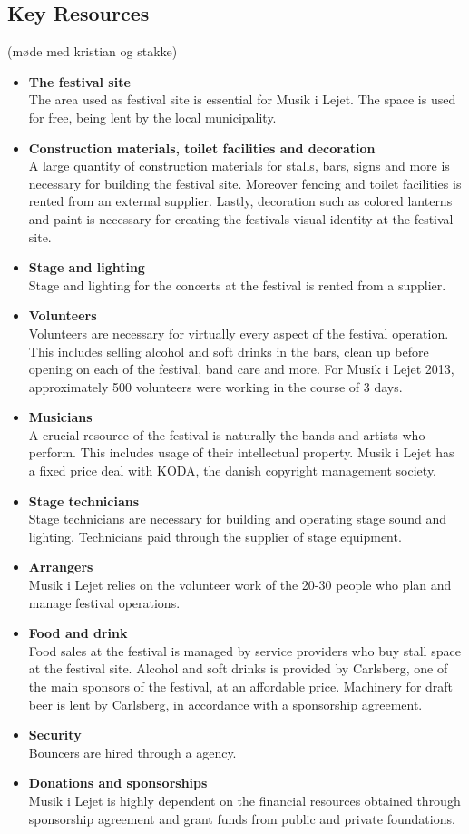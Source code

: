 \subsection{Key Resources} %
\label{sub:key_resources}
(møde med kristian og stakke)
\begin{itemize}
	\item \textbf{The festival site}\\
	The area used as festival site is essential for Musik i Lejet. The space is used for free, being lent by the local municipality.
	\item \textbf{Construction materials, toilet facilities and decoration}\\
	A large quantity of construction materials for stalls, bars, signs and more is necessary for building the festival site. Moreover fencing and toilet facilities is rented from an external supplier. Lastly, decoration such as colored lanterns and paint is necessary for creating the festivals visual identity at the festival site.
	\item \textbf{Stage and lighting}\\
	Stage and lighting for the concerts at the festival is rented from a supplier.
	\item \textbf{Volunteers}\\
	Volunteers are necessary for virtually every aspect of the festival operation. This includes selling alcohol and soft drinks in the bars, clean up before opening on each of the festival, band care and more. For Musik i Lejet 2013, approximately 500 volunteers were working in the course of 3 days.
	\item \textbf{Musicians}\\
	A crucial resource of the festival is naturally the bands and artists who perform. This includes usage of their intellectual property. Musik i Lejet has a fixed price deal with KODA, the danish copyright management society.
	\item \textbf{Stage technicians}\\
	Stage technicians are necessary for building and operating stage sound and lighting. Technicians paid through the supplier of stage equipment.
	\item \textbf{Arrangers}\\
	Musik i Lejet relies on the volunteer work of the 20-30 people who plan and manage festival operations.
	\item \textbf{Food and drink}\\
	Food sales at the festival is managed by service providers who buy stall space at the festival site. Alcohol and soft drinks is provided by Carlsberg, one of the main sponsors of the festival, at an affordable price. Machinery for draft beer is lent by Carlsberg, in accordance with a sponsorship agreement.
	\item \textbf{Security}\\
	Bouncers are hired through a agency.
	\item \textbf{Donations and sponsorships}\\
	Musik i Lejet is highly dependent on the financial resources obtained through sponsorship agreement and grant funds from public and private foundations.
\end{itemize}

